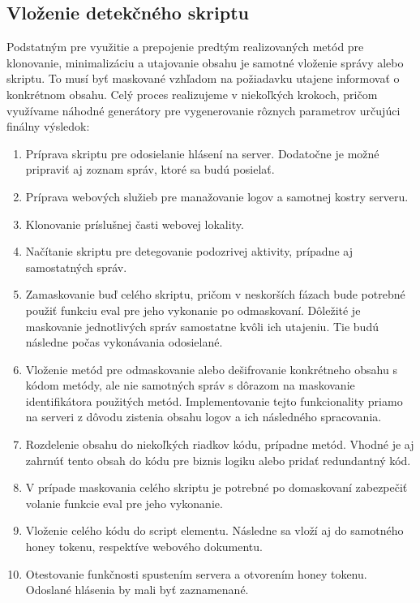 \documentclass[conference, 11pt,slovak,a4paper,twoside]{IEEEtran}
\begin{document}
\subsection{Vloženie detekčného skriptu}

Podstatným pre využitie a prepojenie predtým realizovaných metód pre klonovanie, minimalizáciu a utajovanie obsahu je samotné vloženie správy alebo skriptu. To musí byť maskované vzhľadom na požiadavku utajene informovať o konkrétnom obsahu. Celý proces realizujeme v niekoľkých krokoch, pričom využívame náhodné generátory pre vygenerovanie rôznych parametrov určujúci finálny výsledok:


\begin{enumerate}
	\item Príprava skriptu pre odosielanie hlásení na server. Dodatočne je možné pripraviť aj zoznam správ, ktoré sa budú posielať.

	\item Príprava webových služieb pre manažovanie logov a samotnej kostry serveru.
	
	\item Klonovanie príslušnej časti webovej lokality.
	
	\item Načítanie skriptu pre detegovanie podozrivej aktivity, prípadne aj samostatných správ. 
	
	\item Zamaskovanie buď celého skriptu, pričom v neskorších fázach bude potrebné použiť funkciu eval pre jeho vykonanie po odmaskovaní. Dôležité je maskovanie jednotlivých správ samostatne kvôli ich utajeniu. Tie budú následne počas vykonávania odosielané. 
	
	\item Vloženie metód pre odmaskovanie alebo dešifrovanie konkrétneho obsahu s kódom metódy, ale nie samotných správ s dôrazom na maskovanie identifikátora použitých metód. Implementovanie tejto funkcionality priamo na serveri z dôvodu zistenia obsahu logov a ich následného spracovania.
	
	\item Rozdelenie obsahu do niekoľkých riadkov kódu, prípadne metód. Vhodné je aj zahrnúť tento obsah do kódu pre biznis logiku alebo pridať redundantný kód.
	
	\item V prípade maskovania celého skriptu je potrebné po domaskovaní zabezpečiť volanie funkcie eval pre jeho vykonanie.
	
	\item Vloženie celého kódu do script elementu. Následne sa vloží aj do samotného honey tokenu, respektíve webového dokumentu.
	
	\item Otestovanie funkčnosti spustením servera a otvorením honey tokenu. Odoslané hlásenia by mali byť zaznamenané.
\end{enumerate}
\end{document}
